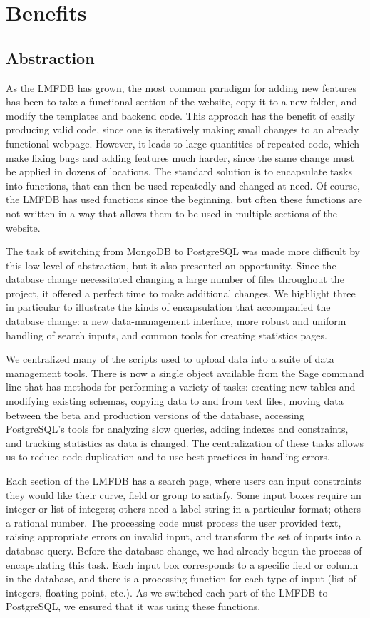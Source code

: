 \documentclass{amsart}
\begin{document}
\section{Benefits}

\subsection{Abstraction}

As the LMFDB has grown, the most common paradigm for adding new features has been to take a functional section of the website, copy it to a new folder, and modify the templates and backend code.
This approach has the benefit of easily producing valid code, since one is iteratively making small changes to an already functional webpage.
However, it leads to large quantities of repeated code, which make fixing bugs and adding features much harder, since the same change must be applied in dozens of locations.
The standard solution is to encapsulate tasks into functions, that can then be used repeatedly and changed at need.
Of course, the LMFDB has used functions since the beginning, but often these functions are not written in a way that allows them to be used in multiple sections of the website.

The task of switching from MongoDB to PostgreSQL was made more difficult by this low level of abstraction, but it also presented an opportunity.
Since the database change necessitated changing a large number of files throughout the project, it offered a perfect time to make additional changes.
We highlight three in particular to illustrate the kinds of encapsulation that accompanied the database change: a new data-management interface, more robust and uniform handling of search inputs, and common tools for creating statistics pages.

We centralized many of the scripts used to upload data into a suite of data management tools.
There is now a single object available from the Sage command line that has methods for performing a variety of tasks: creating new tables and modifying existing schemas, copying data to and from text files, moving data between the beta and production versions of the database, accessing PostgreSQL's tools for analyzing slow queries, adding indexes and constraints, and tracking statistics as data is changed.
The centralization of these tasks allows us to reduce code duplication and to use best practices in handling errors.

Each section of the LMFDB has a search page, where users can input constraints they would like their curve, field or group to satisfy.
Some input boxes require an integer or list of integers; others need a label string in a particular format; others a rational number.
The processing code must process the user provided text, raising appropriate errors on invalid input, and transform the set of inputs into a database query.
Before the database change, we had already begun the process of encapsulating this task.
Each input box corresponds to a specific field or column in the database, and there is a processing function for each type of input (list of integers, floating point, etc.).
As we switched each part of the LMFDB to PostgreSQL, we ensured that it was using these functions.
\end{document}
